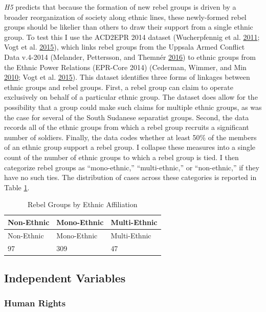 \documentclass[12pt,]{book}
\theoremstyle{definition}
\theoremstyle{definition}
\theoremstyle{remark}
\begin{document}
\emph{H5} predicts that because the formation of new rebel groups is
driven by a broader reorganization of society along ethnic lines, these
newly-formed rebel groups should be likelier than others to draw their
support from a single ethnic group. To test this I use the ACD2EPR 2014
dataset (Wucherpfennig et al.
\protect\hyperlink{ref-Wucherpfennig2011}{2011}; Vogt et al.
\protect\hyperlink{ref-Vogt2015}{2015}), which links rebel groups from
the Uppsala Armed Conflict Data v.4-2014 (Melander, Pettersson, and
Themnér \protect\hyperlink{ref-Melander2016}{2016}) to ethnic groups
from the Ethnic Power Relations (EPR-Core 2014) (Cederman, Wimmer, and
Min \protect\hyperlink{ref-Cederman2010}{2010}; Vogt et al.
\protect\hyperlink{ref-Vogt2015}{2015}). This dataset identifies three
forms of linkages between ethnic groups and rebel groups. First, a rebel
group can claim to operate exclusively on behalf of a particular ethnic
group. The dataset does allow for the possibility that a group could
make such claims for multiple ethnic groups, as was the case for several
of the South Sudanese separatist groups. Second, the data records all of
the ethnic groups from which a rebel group recruits a significant number
of soldiers. Finally, the data codes whether at least 50\% of the
members of an ethnic group support a rebel group. I collapse these
measures into a single count of the number of ethnic groups to which a
rebel group is tied. I then categorize rebel groups as ``mono-ethnic,''
``multi-ethnic,'' or ``non-ethnic,'' if they have no such ties. The
distribution of cases across these categories is reported in Table
\ref{tab:acd2epr}.

\begin{longtable}[]{@{}lll@{}}
\caption{\label{tab:acd2epr} Rebel Groups by Ethnic
Affiliation}\tabularnewline
\toprule
Non-Ethnic & Mono-Ethnic & Multi-Ethnic\tabularnewline
\midrule
\endfirsthead
\toprule
Non-Ethnic & Mono-Ethnic & Multi-Ethnic\tabularnewline
\midrule
\endhead
97 & 309 & 47\tabularnewline
\bottomrule
\end{longtable}

\subsection{Independent Variables}\label{independent-variables}

\subsubsection*{Human Rights}\label{human-rights}
\end{document}
